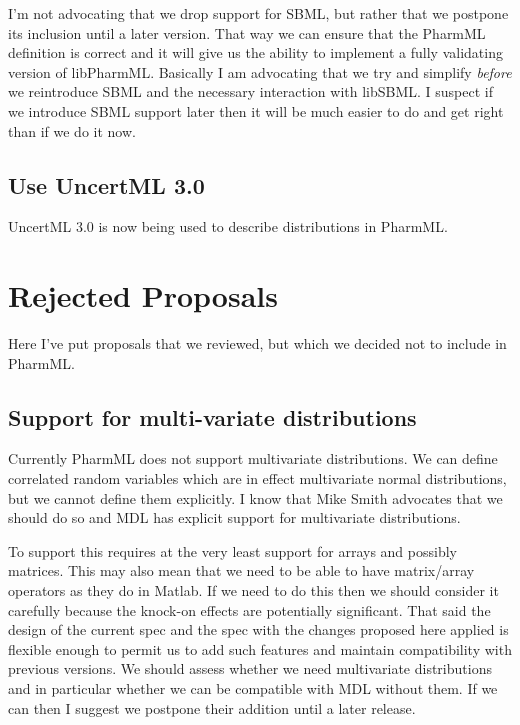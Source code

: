 \documentclass[a4paper,10pt]{article}
\newcommand{\pharmml}{PharmML\xspace}
\begin{document}
I'm not advocating that we drop support for SBML, but rather that we
postpone its inclusion until a later version. That way we can ensure
that the \pharmml definition is correct and it will give us the
ability to implement a fully validating version of
libPharmML. Basically I am advocating that we try and simplify
\emph{before} we reintroduce SBML and the necessary interaction with
libSBML. I suspect if we introduce SBML support later then it will be
much easier to do and get right than if we do it now.

\subsection{Use UncertML 3.0}

UncertML 3.0 is now being used to describe distributions in \pharmml.


\section{Rejected Proposals}

Here I've put proposals that we reviewed, but which we decided not to
include in \pharmml.

\subsection{Support for multi-variate distributions}

Currently \pharmml does not support multivariate distributions. We can
define correlated random variables which are in effect multivariate
normal distributions, but we cannot define them explicitly. I know
that Mike Smith advocates that we should do so and MDL has explicit
support for multivariate distributions.

To support this requires at the very least support for arrays and
possibly matrices. This may also mean that we need to be able to have
matrix/array operators as they do in Matlab. If we need to do this
then we should consider it carefully because the knock-on effects are
potentially significant. That said the design of the current
spec and the spec with the changes proposed here applied is flexible
enough to permit us to add such features and maintain compatibility
with previous versions. We should assess whether we need multivariate
distributions and in particular whether we can be compatible with MDL
without them. If we can then I suggest we postpone their addition
until a later release.
\end{document}
